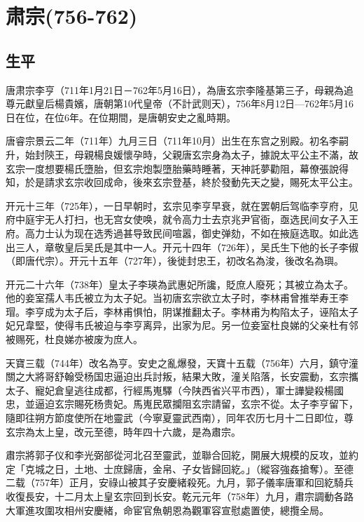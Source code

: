 
\section{肃宗\tiny(756-762)}

\subsection{生平}

唐肃宗李亨（711年1月21日－762年5月16日），為唐玄宗李隆基第三子，母親為追尊元獻皇后楊貴嬪，唐朝第10代皇帝（不計武则天），756年8月12日—762年5月16日在位，在位6年。在位期間，是唐朝安史之亂時期。

唐睿宗景云二年（711年）九月三日（711年10月）出生在东宫之别殿。初名李嗣升，始封陝王，母親楊良媛懷孕時，父親唐玄宗身為太子，據說太平公主不滿，故玄宗一度想要楊氏墮胎，但玄宗炮製墮胎藥時睡著，天神託夢勸阻，幕僚張說得知，於是請求玄宗收回成命，後來玄宗登基，終於發動先天之變，賜死太平公主。

开元十三年（725年），一日早朝时，玄宗见李亨早衰，就在罢朝后驾临李亨府，见府中庭宇无人打扫，也无宫女使唤，就令高力士去京兆尹官衙，亟选民间女子入王府。高力士认为现在选秀過甚导致民间喧嚣，御史弹劾，不如在掖庭选取。如此选出三人，章敬皇后吴氏是其中一人。开元十四年（726年），吴氏生下他的长子李俶（即唐代宗）。开元十五年（727年），後徙封忠王，初改名為浚，後改名為璵。

开元二十六年（738年）皇太子李瑛為武惠妃所讒，貶庶人廢死；其被立為太子。他的妾室孺人韦氏被立为太子妃。当初唐玄宗欲立太子时，李林甫曾推举寿王李瑁。李亨成为太子后，李林甫惧怕，阴谋推翻太子。李林甫为构陷太子，诬陷太子妃兄韋堅，使得韦氏被迫与李亨离异，出家为尼。另一位妾室杜良娣的父亲杜有邻被赐死，杜良娣亦被废为庶人。

天寶三载（744年）改名為亨。安史之亂爆發，天寶十五载（756年）六月，鎮守潼關之大將哥舒翰受杨国忠逼迫出兵討叛，結果大敗，潼关陷落，长安震動，玄宗攜太子、寵妃倉皇逃往成都，行經馬嵬驛（今陕西省兴平市西），軍士譁變殺楊國忠，並逼迫玄宗賜死杨贵妃。馬嵬民眾攔阻玄宗請留，玄宗不從。太子李亨留下，隨即往朔方節度使所在地靈武（今寧夏靈武西南），同年农历七月十二日即位，尊玄宗為太上皇，改元至德，時年四十六歲，是為肅宗。

肅宗將郭子仪和李光弼部從河北召至靈武，並聯合回紇，開展大規模的反攻，並約定「克城之日，土地、士庶歸唐，金帛、子女皆歸回紇。」（縱容強姦搶奪）。至德二载（757年）正月，安祿山被其子安慶緒殺死。九月，郭子儀率唐軍和回紇騎兵收復長安，十二月太上皇玄宗回到长安。乾元元年（758年）九月，肅宗調動各路大軍進攻圍攻相州安慶緒，命宦官魚朝恩為觀軍容宣慰處置使，總攬全局。


